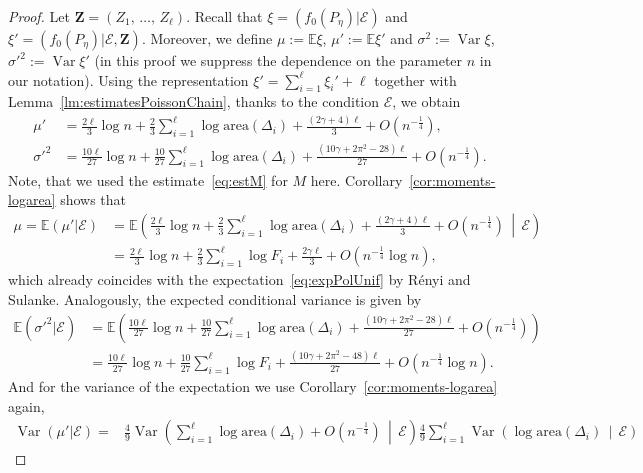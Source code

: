 \documentclass[10pt]{amsart}
\theoremstyle{definition}\newtheorem{defi}[theo]{Definition}\newtheorem{rema}[theo]{Remark}\newtheorem{exam}[theo]{Example}\newtheorem{exem}[theo]{Example}\newtheorem{nota}[theo]{Notation}
\newcommand{\var}{\operatorname{Var}}
\newcommand{\bfZ}{\mathbf{Z}}
\newcommand{\bbE}{\mathbb{E}}
\newcommand{\clE}{\mathcal{E}}
\newcommand{\area}{\mathrm{area}}
\begin{document}
\begin{proof}
Let ${\bfZ}=(Z_1,\,\dots,\,Z_\ell)$. Recall that $\xi=(f_0(P_{\eta})|\clE)$ and $\xi'=(f_0(P_{\eta})|\clE, {\bfZ})$. Moreover, we define $\mu:=\bbE\xi$, $\mu':=\bbE\xi'$ and $\sigma^2:=\var \xi$, ${\sigma'}^2:=\var \xi' $ (in this proof we suppress the dependence on the parameter $n$ in our notation). Using the representation $\xi'=\sum_{i=1}^\ell \xi_i'+\ell $ together with Lemma~\ref{lm:estimatesPoissonChain}, thanks to the condition $\clE$, we obtain
\begin{align*}
\mu' &= \frac{2 \ell}{3}\log n +\frac{2}{3}\sum_{i=1}^\ell \log{\area}(\Delta_i)+\frac{(2 \gamma + 4)\ell }3 + O\left(n^{-\frac 14}\right),\qquad
\\
\sigma'^2 &= \frac{10 \ell}{27}\log n +\frac{10}{27}\sum_{i=1}^\ell \log{\area}(\Delta_i) +
\frac{\left(10 \gamma + 2\pi^2 - 28\right)\ell }{27} + O\left(n^{-\frac 14}\right).
\end{align*}
Note, that we used the estimate~\eqref{eq:estM} for $M$ here. Corollary~\ref{cor:moments-logarea} shows that
\begin{align*}
\mu =
\bbE (\mu' | \clE) &=
\bbE \left(\frac{2 \ell}{3}\log n +\frac{2}{3}\sum_{i=1}^\ell \log{\area}(\Delta_i)+\frac{(2 \gamma + 4)\ell }3 + O(n^{-\frac 14}) \, \middle|\,\clE \right)
\\ &= \frac{2 \ell}{3}\log n + \frac 23 \sum_{i=1}^\ell \log F_i + \frac{2 \gamma \ell }3 + O\left(n^{- \frac 14} \log n\right),
\end{align*}
which already coincides with the expectation~\eqref{eq:expPolUnif} by Rényi and Sulanke. Analogously, the expected conditional variance is given by
\begin{align*}
\bbE ({\sigma'}^2 | \clE) &=
\bbE \left(\frac{10 \ell}{27}\log n +\frac{10}{27}\sum_{i=1}^\ell \log{\area}(\Delta_i) +
\frac{\left(10 \gamma + 2\pi^2 - 28\right)\ell }{27} + O\left(n^{-\frac 14}\right) \right)
\\ &= \frac{10 \ell}{27}\log n +\frac{10}{27}\sum_{i=1}^\ell \log F_i +
\frac{\left(10 \gamma + 2\pi^2 - 48\right)\ell }{27} + O\left(n^{-\frac 14} \log n\right).
\end{align*}
And for the variance of the expectation we use Corollary~\ref{cor:moments-logarea} again,
\begin{align*}
\var (\mu' | \clE) = &
\frac 49 \var \left(\sum_{i=1}^\ell \log {\area} (\Delta_i) +O(n^{-\frac 14})\, \middle|\,\clE \right)
\frac 49 \sum_{i=1}^\ell \var \left(\log {\area} (\Delta_i) \, \middle|\,\clE \right)

\end{align*}
\end{proof}
\end{document}
